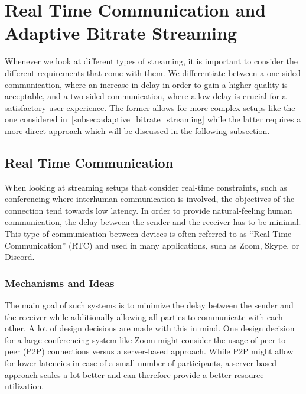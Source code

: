 \section{Real Time Communication and Adaptive Bitrate Streaming}\label{sec:rt_and_adaptive_bitrate_streaming}

Whenever we look at different types of streaming, it is important to consider the 
different requirements that come with them.
We differentiate between a one-sided communication, where an increase in delay 
in order to gain a higher quality is acceptable, and a two-sided communication, 
where a low delay is crucial for a satisfactory user experience.
The former allows for more complex setups like the one considered 
in~\autoref{subsec:adaptive_bitrate_streaming} while the latter requires
a more direct approach which will be discussed in the following subsection.

\subsection{Real Time Communication}
When looking at streaming setups that consider real-time constraints, such as conferencing 
where interhuman communication is involved, the objectives of the connection tend towards
low latency.
In order to provide natural-feeling human communication, the delay between the sender 
and the receiver has to be minimal.
This type of communication between devices is often referred to as ``Real-Time Communication'' 
(RTC) and used in many applications, such as Zoom, Skype, or Discord.

\subsubsection{Mechanisms and Ideas}
The main goal of such systems is to minimize the delay between the sender and the receiver
while additionally allowing all parties to communicate with each other.
A lot of design decisions are made with this in mind.
One design decision for a large conferencing system like Zoom
might consider the usage of peer-to-peer (P2P) connections versus a server-based
approach.
While P2P might allow for lower latencies in case of a small number of participants,
a server-based approach scales a lot better and can therefore provide a better
resource utilization.

